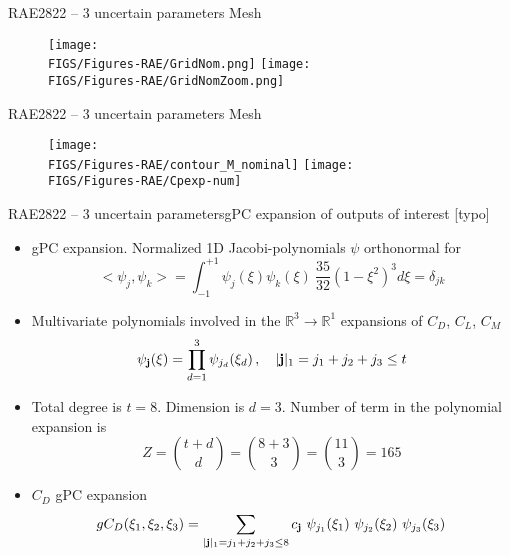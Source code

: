 \documentclass[10pt]{beamer}
\def\vo{\vspace{1mm}}
\def\begit{\begin{itemize}}
\def\endit{\end{itemize}}
\newcommand{\dimrv}{d}
\newcommand{\torder}{t}
\newcommand{\drag}{C_D}
\newcommand{\lift}{C_L}
\newcommand{\moment}{C_M}
\newcommand{\Rset}{{\mathbb R}}
\begin{document}
%
\begin{frame}{RAE2822 -- 3 uncertain parameters} {Mesh}
%
\begin{figure}[!h]
\begin{center}
\texttt{[image: \\FIGS/Figures-RAE/GridNom.png]}
\hspace{3mm}
\texttt{[image: \\FIGS/Figures-RAE/GridNomZoom.png]}
\end{center}
\end{figure}
%
\end{frame}
%
%
\begin{frame}{RAE2822 -- 3 uncertain parameters} {Mesh}
%
\begin{figure}[!h]
\begin{center}
\centering
\texttt{[image: \\FIGS/Figures-RAE/contour\_M\_nominal]}
\hspace{3mm}
\texttt{[image: \\FIGS/Figures-RAE/Cpexp-num]}
\end{center}
\end{figure}
%
\end{frame}
%
%
%
\begin{frame}{RAE2822 -- 3 uncertain parameters}{gPC expansion of outputs of interest [typo]}  
%
\footnotesize{
\begit
%
\item gPC expansion. Normalized 1D Jacobi-polynomials $\psi$ orthonormal for   
                  $$<\psi_j,\psi_k>=\int_{-1}^{+1}\psi_j(\xi)\psi_k(\xi)~ \frac{35}{32}(1-\xi^2)^3 d\xi = \delta_{jk}$$
%
\item Multivariate polynomials involved in the $\Rset^3 \to \Rset^1$ expansions of $\drag$, $\lift$, $\moment$
 $$ \psi_{\bf j}({\bf \xi})=\prod_{d=1}^3\psi_{j_d}(\xi_d)\,, \quad | {\bf j} |_1 = j_1 + j_2 + j_3 \leq t $$
%
\item Total degree is $\torder=8$. Dimension is $\dimrv=3$. Number of term in the polynomial expansion is
    $$ Z = \binom{\torder+\dimrv}{\dimrv} = \binom{8+3}{3} = \binom{11}{3} = 165  $$
\vo
\item $\drag$ gPC expansion
 $$ g\drag(\xi_1, \xi_2, \xi_3) = \sum_{| {\bf j} |_1=j_1+j_2+j_3 \leq 8} c_{\bf j}~ \psi_{j_1}(\xi_1) ~ \psi_{j_2}(\xi_2) ~ \psi_{j_3}(\xi_3)  $$ 
\endit
}
%
\end{frame} 
%
\end{document}

